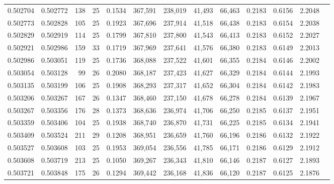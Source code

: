 \begin{tabular}{rrrrrrrrrrrrr}
0.502704 & 0.502772 & 138 &  25 &                                     0.1534 & 367,591 & 238,019 &  41,493 &  66,463 & 0.2183 & 0.6156 & 2.2048 \\
0.502773 & 0.502828 & 105 &  25 &                                     0.1923 & 367,696 & 237,914 &  41,518 &  66,438 & 0.2183 & 0.6154 & 2.2038 \\
0.502829 & 0.502919 & 114 &  25 &                                     0.1799 & 367,810 & 237,800 &  41,543 &  66,413 & 0.2183 & 0.6152 & 2.2027 \\
0.502921 & 0.502986 & 159 &  33 &                                     0.1719 & 367,969 & 237,641 &  41,576 &  66,380 & 0.2183 & 0.6149 & 2.2013 \\
0.502986 & 0.503051 & 119 &  25 &                                     0.1736 & 368,088 & 237,522 &  41,601 &  66,355 & 0.2184 & 0.6146 & 2.2002 \\
0.503054 & 0.503128 &  99 &  26 &                                     0.2080 & 368,187 & 237,423 &  41,627 &  66,329 & 0.2184 & 0.6144 & 2.1993 \\
0.503135 & 0.503199 & 106 &  25 &                                     0.1908 & 368,293 & 237,317 &  41,652 &  66,304 & 0.2184 & 0.6142 & 2.1983 \\
0.503206 & 0.503267 & 167 &  26 &                                     0.1347 & 368,460 & 237,150 &  41,678 &  66,278 & 0.2184 & 0.6139 & 2.1967 \\
0.503267 & 0.503356 & 176 &  28 &                                     0.1373 & 368,636 & 236,974 &  41,706 &  66,250 & 0.2185 & 0.6137 & 2.1951 \\
0.503359 & 0.503406 & 104 &  25 &                                     0.1938 & 368,740 & 236,870 &  41,731 &  66,225 & 0.2185 & 0.6134 & 2.1941 \\
0.503409 & 0.503524 & 211 &  29 &                                     0.1208 & 368,951 & 236,659 &  41,760 &  66,196 & 0.2186 & 0.6132 & 2.1922 \\
0.503527 & 0.503608 & 103 &  25 &                                     0.1953 & 369,054 & 236,556 &  41,785 &  66,171 & 0.2186 & 0.6129 & 2.1912 \\
0.503608 & 0.503719 & 213 &  25 &                                     0.1050 & 369,267 & 236,343 &  41,810 &  66,146 & 0.2187 & 0.6127 & 2.1893 \\
0.503721 & 0.503848 & 175 &  26 &                                     0.1294 & 369,442 & 236,168 &  41,836 &  66,120 & 0.2187 & 0.6125 & 2.1876 \\

\end{tabular}
